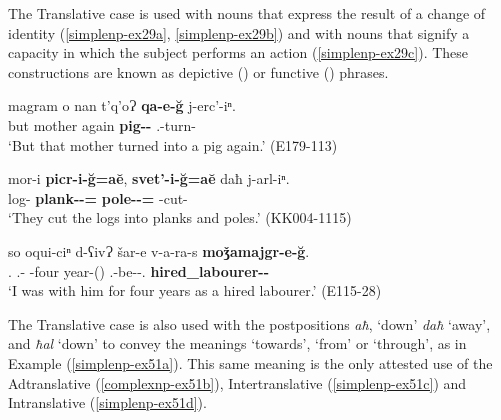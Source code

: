 The Translative case is used with nouns that express the result of a change of identity (\ref{simplenp-ex29a}, \ref{simplenp-ex29b}) and with nouns that signify a capacity in which the subject performs an action (\ref{simplenp-ex29c}). These constructions are known as depictive (\cite{himmelmannschultze}) or functive (\cite{creissels14functive}) phrases.


\begin{exe}
	\ex\label{simplenp-ex29}
	\begin{xlist}
		
		
			\ex\label{simplenp-ex29a}
			\gll magram o nan t'q'oɁ \textbf{qa-e-\u{g}} j-erc'-iⁿ. \\
			but {\Dist} mother again \textbf{pig-{\Obl}-{\Trans}} {\F}.{\Sg}-turn-{\Aor} \\
			\trans `But that mother turned into a pig again.'
			\hfill (E179-113)
		
		
		\ex\label{simplenp-ex29b}
		\gll mor-i \textbf{picr-i-\u{g}=a\u{e}}, \textbf{svet'-i-\u{g}=a\u{e}} daħ j-arl-iⁿ. \\
		log-{\Pl} \textbf{plank-{\Pl}-{\Trans}={\Add}} \textbf{pole-{\Pl}-{\Trans}={\Add}} {\Pv} {\J}-cut-{\Aor} \\
		\trans `They cut the logs into planks and poles.'
		\hfill (KK004-1115)
		
		
			\ex\label{simplenp-ex29c}
			\gll so oqui-ciⁿ d-ʕivɁ šar-e v-a-ra-s \textbf{moǯamajgr-e-\u{g}}. \\
			{\Fsg}.{\Nom} {\Dist}.{\Obl}-{\Apudess} {\D}-four year-{\Obl}({\Ess}) {\M}.{\Sg}-be-{{\Imprf}}-{\Fsg}.{\Nom} \textbf{hired\_labourer-{\Obl}-{\Trans}} \\
			\trans `I was with him for four years as a hired labourer.'
			\hfill (E115-28)
		
		
	\end{xlist}
\end{exe}

The Translative case is also used with the postpositions \textit{aħ}, `down' \textit{daħ} `away', and \textit{ħal} `down' to convey the meanings `towards', `from' or `through', as in Example (\ref{simplenp-ex51a}). This same meaning is the only attested use of the Adtranslative (\ref{complexnp-ex51b}), Intertranslative (\ref{simplenp-ex51c}) and Intranslative (\ref{simplenp-ex51d}).

